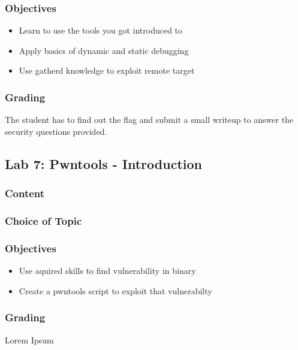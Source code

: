\subsubsection*{Objectives}
\begin{itemize}
    \item Learn to use the tools you got introduced to
    \item Apply basics of dynamic and static debugging
    \item Use gatherd knowledge to exploit remote target
\end{itemize}
\subsubsection*{Grading}
The student has to find out the flag and submit a small writeup to answer the security questions provided.

\subsection{Lab 7: Pwntools - Introduction}
\subsubsection*{Content}

\subsubsection*{Choice of Topic}

\subsubsection*{Objectives}
\begin{itemize}
    \item Use aquired skills to find vulnerability in binary
    \item Create a pwntools script to exploit that vulnerabilty
\end{itemize}
\subsubsection*{Grading}
Lorem Ipsum
